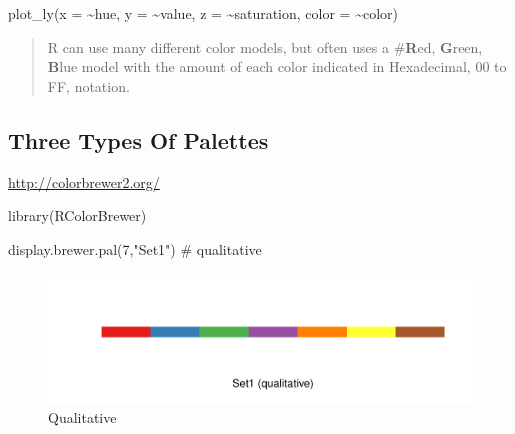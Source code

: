 \documentclass[
]{article}
\newenvironment{Shaded}{}{}
\newcommand{\AttributeTok}[1]{#1}
\newcommand{\CommentTok}[1]{\textcolor[rgb]{0.00,0.50,0.00}{#1}}
\newcommand{\DecValTok}[1]{#1}
\newcommand{\FunctionTok}[1]{#1}
\newcommand{\NormalTok}[1]{#1}
\newcommand{\SpecialCharTok}[1]{\textcolor[rgb]{0.00,0.50,0.50}{#1}}
\newcommand{\StringTok}[1]{\textcolor[rgb]{0.00,0.50,0.50}{#1}}
\begin{document}
\begin{Shaded}
\begin{Highlighting}[]
\FunctionTok{plot\_ly}\NormalTok{(}\AttributeTok{x =} \SpecialCharTok{\textasciitilde{}}\NormalTok{hue, }
        \AttributeTok{y =} \SpecialCharTok{\textasciitilde{}}\NormalTok{value, }
        \AttributeTok{z =} \SpecialCharTok{\textasciitilde{}}\NormalTok{saturation, }
        \AttributeTok{color =} \SpecialCharTok{\textasciitilde{}}\NormalTok{color)}
\end{Highlighting}
\end{Shaded}

\begin{quote}
R can use many different color models, but often uses a \#\textbf{R}ed,
\textbf{G}reen, \textbf{B}lue model with the amount of each color
indicated in Hexadecimal, 00 to FF, notation.
\end{quote}

\hypertarget{three-types-of-palettes}{%
\subsection{Three Types Of Palettes}\label{three-types-of-palettes}}

\url{http://colorbrewer2.org/}

\begin{Shaded}
\begin{Highlighting}[]
\FunctionTok{library}\NormalTok{(RColorBrewer)}
\end{Highlighting}
\end{Shaded}

\begin{Shaded}
\begin{Highlighting}[]
\FunctionTok{display.brewer.pal}\NormalTok{(}\DecValTok{7}\NormalTok{,}\StringTok{"Set1"}\NormalTok{) }\CommentTok{\# qualitative}
\end{Highlighting}
\end{Shaded}

\begin{figure}
\centering
\includegraphics{design_files/figure-latex/unnamed-chunk-4-1.pdf}
\caption{Qualitative}
\end{figure}
\end{document}
